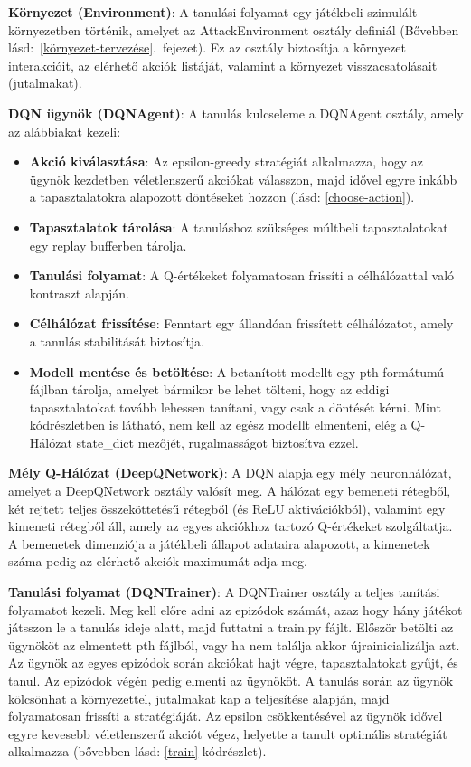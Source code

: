 \documentclass[
]{thesis-ekf}
\theoremstyle{definition}
\theoremstyle{remark}
\begin{document}
	\textbf{Környezet (Environment)}: A tanulási folyamat egy játékbeli szimulált környezetben történik, amelyet az AttackEnvironment osztály definiál (Bővebben lásd:~\ref{környezet-tervezése}.~fejezet). Ez az osztály biztosítja a környezet interakcióit, az elérhető akciók listáját, valamint a környezet visszacsatolásait (jutalmakat).
	
	\textbf{DQN ügynök (DQNAgent)}: A tanulás kulcseleme a DQNAgent osztály, amely az alábbiakat kezeli:
	
	\begin{itemize}
		\item \textbf{Akció kiválasztása}: Az epsilon-greedy stratégiát alkalmazza, hogy az ügynök kezdetben véletlenszerű akciókat válasszon, majd idővel egyre inkább a tapasztalatokra alapozott döntéseket hozzon (lásd: \ref{choose-action}).
		
		\item \textbf{Tapasztalatok tárolása}: A tanuláshoz szükséges múltbeli tapasztalatokat egy replay bufferben tárolja.
		\item \textbf{Tanulási folyamat}: A Q-értékeket folyamatosan frissíti a célhálózattal való kontraszt alapján.
		\item \textbf{Célhálózat frissítése}: Fenntart egy állandóan frissített célhálózatot, amely a tanulás stabilitását biztosítja.
		\item \textbf{Modell mentése és betöltése}: A betanított modellt egy pth formátumú fájlban tárolja, amelyet bármikor be lehet tölteni, hogy az eddigi tapasztalatokat tovább lehessen tanítani, vagy csak a döntését kérni. Mint  kódrészletben is látható, nem kell az egész modellt elmenteni, elég a Q-Hálózat state\_dict mezőjét, rugalmasságot biztosítva ezzel. 
		
	\end{itemize}
	
	\textbf{Mély Q-Hálózat (DeepQNetwork)}: A DQN alapja egy mély neuronhálózat, amelyet a DeepQNetwork osztály valósít meg. A hálózat egy bemeneti rétegből, két rejtett teljes összeköttetésű rétegből (és ReLU aktivációkból), valamint egy kimeneti rétegből áll, amely az egyes akciókhoz tartozó Q-értékeket szolgáltatja. A bemenetek dimenziója a játékbeli állapot adataira alapozott, a kimenetek száma pedig az elérhető akciók maximumát adja meg. 
	
	\textbf{Tanulási folyamat (DQNTrainer)}: A DQNTrainer osztály a teljes tanítási folyamatot kezeli. Meg kell előre adni az epizódok számát, azaz hogy hány játékot játsszon le a tanulás ideje alatt, majd futtatni a train.py fájlt. Először betölti az ügynököt az elmentett pth fájlból, vagy ha nem találja akkor újrainicializálja azt. Az ügynök az egyes epizódok során akciókat hajt végre, tapasztalatokat gyűjt, és tanul. Az epizódok végén pedig elmenti az ügynököt. A tanulás során az ügynök kölcsönhat a környezettel, jutalmakat kap a teljesítése alapján, majd folyamatosan frissíti a stratégiáját. Az epsilon csökkentésével az ügynök idővel egyre kevesebb véletlenszerű akciót végez, helyette a tanult optimális stratégiát alkalmazza (bővebben lásd: \ref{train} kódrészlet).
	
\end{document}
